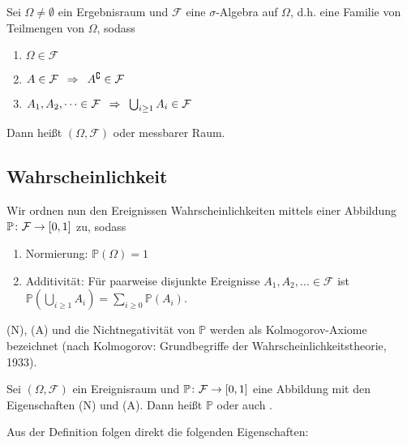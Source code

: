\begin{definition}[Ereignisraum]
    Sei $\Omega \neq \emptyset$ ein Ergebnisraum und $\mathcal{F}$ eine $\sigma$-Algebra auf $\Omega$, d.h. eine Familie von Teilmengen von $\Omega$, sodass 
    \begin{enumerate}
        \item $\Omega \in \mathcal F$
        \item $A \in \mathcal{F} \enskip \Rightarrow \enskip A^\complement \in \mathcal{F}$
        \item $A_1, A_2, \dots \in \mathcal{F} \enskip \Rightarrow \enskip \bigcup_{i \geq 1} A_i \in \mathcal{F}$
    \end{enumerate}
    Dann heißt $(\Omega, \mathcal{F})$  oder messbarer Raum.
\end{definition}

\subsection*{Wahrscheinlichkeit}
Wir ordnen nun den Ereignissen Wahrscheinlichkeiten mittels einer Abbildung $\mathbb{P} \colon \mathcal{F} \to [0,1]$
zu, sodass
\begin{enumerate}
    \item[(N)] Normierung: $\mathbb{P}(\Omega) = 1$
    \item[(A)] Additivität: Für paarweise disjunkte Ereignisse $A_1, A_2, \dots \in \mathcal{F}$ ist $\mathbb{P}\left(\bigcup_{i \geq 1} A_i\right) = \sum_{i \geq 0} \mathbb{P}(A_i)$.
\end{enumerate}

(N), (A) und die Nichtnegativität von $\mathbb{P}$ werden als Kolmogorov-Axiome bezeichnet (nach Kolmogorov: Grundbegriffe der Wahrscheinlichkeitstheorie, 1933).

\begin{definition}[Wahrscheinlichkeit]
    Sei $(\Omega, \mathcal{F})$ ein Ereignisraum und $\mathbb{P} \colon \mathcal{F} \to [0,1]$ eine Abbildung mit den Eigenschaften (N) und (A). Dann heißt $\mathbb{P}$  oder auch .
\end{definition}

Aus der Definition folgen direkt die folgenden Eigenschaften:

